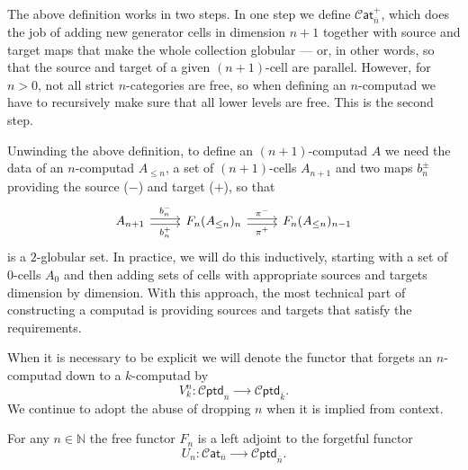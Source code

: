 \documentclass[12pt,a4paper]{article}
\numberwithin{equation}{section}
\newcommand{\cat}[1]{\mathscr{C} \mathsf{at}_{\overline{#1}}}
\newcommand{\cptd}[1]{\mathscr{C} \mathsf{ptd}_{\overline{#1}}}
\begin{document}
\begin{remark}
    The above definition works in two steps. In one step we define $\cat{n}^+$, which does the job of adding new generator cells in dimension $n+1$ together with source and target maps that make the whole collection globular --- or, in other words, so that the source and target of a given $(n+1)$-cell are parallel. However, for $n>0$, not all strict $n$-categories are free, so when defining an $n$-computad we have to recursively make sure that all lower levels are free. This is the second step.
\end{remark}

\begin{remark}
    Unwinding the above definition, to define an $(n+1)$-computad $A$ we need the data of an $n$-computad $A_{\leq n}$, a set of $(n+1)$-cells $A_{n+1}$ and two maps $b^{\pm}_n$ providing the source ($-$) and target ($+$), so that
    \begin{equation}
        \begin{tikzcd}
            A_{n+1} \arrow[r, shift left=0.5ex, "b_n^-"] \arrow[r, shift right=0.5ex, "b_n^+"'] & F_n(A_{\leq n})_n \arrow[r, shift left=0.5ex, "\pi^-"] \arrow[r, shift right=0.5ex, "\pi^+"'] & F_n(A_{\leq n})_{n-1} 
        \end{tikzcd}
    \end{equation}
    is a $2$-globular set. In practice, we will do this inductively, starting with a set of 0-cells $A_0$ and then adding sets of cells with appropriate sources and targets dimension by dimension. With this approach, the most technical part of constructing a computad is providing sources and targets that satisfy the requirements.
\end{remark}

\begin{remark}
    When it is necessary to be explicit we will denote the functor that forgets an $n$-computad down to a $k$-computad by
    \begin{equation}
        V^n_k: \cptd{n} \xrightarrow{\qquad} \cptd{k}.
    \end{equation}
    We continue to adopt the abuse of dropping $n$ when it is implied from context.
\end{remark}

\begin{proposition}\label{prop:F_is_free}
    For any $n \in \mathbb{N}$ the free functor $F_n$ is a left adjoint to the forgetful functor
    \begin{equation}
        U_n: \cat{n} \xrightarrow{\qquad} \cptd{n}.
    \end{equation}
\end{proposition}
\end{document}
